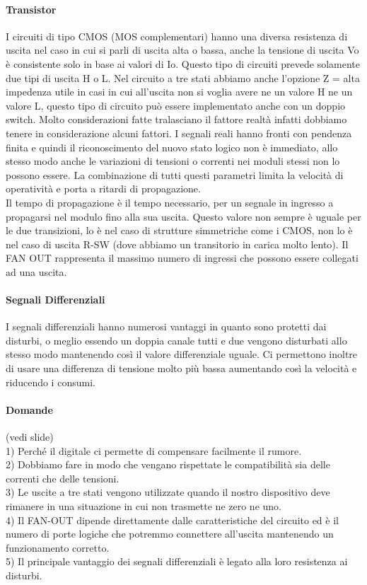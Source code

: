 \documentclass[12pt]{article}
\begin{document}
\paragraph{Transistor} I circuiti di tipo CMOS (MOS complementari) hanno una diversa resistenza di uscita nel caso in cui si parli di uscita alta o bassa, anche la tensione di uscita Vo è consistente solo in base ai valori di Io. Questo tipo di circuiti prevede solamente due tipi di uscita H o L. Nel circuito a tre stati abbiamo anche l’opzione Z = alta impedenza utile in casi in cui all’uscita non si voglia avere ne un valore H ne un valore L, questo tipo di circuito può essere implementato anche con un doppio switch. Molto considerazioni fatte tralasciano il fattore realtà infatti dobbiamo tenere in considerazione alcuni fattori. I segnali reali hanno fronti con pendenza finita e quindi il riconoscimento del nuovo stato logico non è immediato, allo stesso modo anche le variazioni di tensioni o correnti nei moduli stessi non lo possono essere. La combinazione di tutti questi parametri limita la velocità di operatività e porta a ritardi di propagazione.\\
Il tempo di propagazione è il tempo necessario, per un segnale in ingresso a propagarsi nel modulo fino alla sua uscita. Questo valore non sempre è uguale per le due transizioni, lo è nel caso di strutture simmetriche come i CMOS, non lo è nel caso di uscita R-SW (dove abbiamo un transitorio in carica molto lento). Il FAN OUT rappresenta il massimo numero di ingressi che possono essere collegati ad una uscita.
\paragraph{Segnali Differenziali} I segnali differenziali hanno numerosi vantaggi in quanto sono protetti dai disturbi, o meglio essendo un doppia canale tutti e due vengono disturbati allo stesso modo mantenendo così il valore differenziale uguale. Ci permettono inoltre di usare una differenza di tensione molto più bassa aumentando così la velocità e riducendo i consumi.

\paragraph{Domande} (vedi slide)\\
1) Perché il digitale ci permette di compensare facilmente il rumore.\\
2) Dobbiamo fare in modo che vengano rispettate le compatibilità sia delle correnti che delle tensioni.\\
3) Le uscite a tre stati vengono utilizzate quando il nostro dispositivo deve rimanere in una situazione in cui non trasmette ne zero ne uno.\\
4) Il FAN-OUT dipende direttamente dalle caratteristiche del circuito ed è il numero di porte logiche che potremmo connettere all’uscita mantenendo un funzionamento corretto.\\
5) Il principale vantaggio dei segnali differenziali è legato alla loro resistenza ai disturbi.
\end{document}

